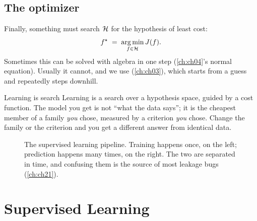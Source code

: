 \subsection{The optimizer}

Finally, something must search $\mathcal{H}$ for the hypothesis of least cost:
\[
  f^\star \;=\; \operatorname*{arg\,min}_{f\in\mathcal{H}} J(f).
\]
Sometimes this can be solved with algebra in one step (\cref{ch:ch04}'s normal
equation). Usually it cannot, and we use 
(\cref{ch:ch03}), which starts from a guess and repeatedly steps downhill.

\begin{keyinsight}{Learning is search}
Learning is a search over a hypothesis space, guided by a cost function. The
model you get is not ``what the data says''; it is the cheapest member of a
family \emph{you} chose, measured by a criterion \emph{you} chose. Change the
family or the criterion and you get a different answer from identical data.
\end{keyinsight}

\begin{figure}[htbp]
  \centering
  \caption{The supervised learning pipeline. Training happens once, on the left;
  prediction happens many times, on the right. The two are separated in time,
  and confusing them is the source of most leakage bugs (\cref{ch:ch21}).}
  \label{fig:pipeline}
\end{figure}

\section{Supervised Learning}
\label{sec:supervised}

